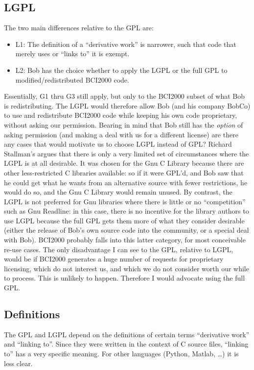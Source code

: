 \documentclass{article}
\begin{document}
\subsection*{LGPL}
The two main differences relative to the GPL are:
\begin{itemize}
    \item[] L1: The definition of a ``derivative work'' is narrower, such that code that merely uses or ``links to'' it is exempt.
    \item[] L2: Bob has the choice whether to apply the LGPL or the full GPL to modified/redistributed BCI2000 code.
\end{itemize}

Essentially, G1 thru G3 still apply, but only to the BCI2000 subset of what Bob is redistributing. The LGPL would therefore allow Bob (and his company BobCo) to use and redistribute BCI2000 code while keeping his own code proprietary, without asking our permission.  Bearing in mind that Bob still has the {\em option} of asking permission (and making a deal with us for a different license) are there any cases that would motivate us to choose LGPL instead of GPL?  Richard Stallman's argues \cite{stallman} that there is only a very limited set of circumstances where the LGPL is at all desirable. It was chosen for the Gnu C Library because there are other less-restricted C libraries available: so if it were GPL'd, and Bob saw that he could get what he wants from an alternative source with fewer restrictions, he would do so, and the Gnu C Library would remain unused. By contrast, the LGPL is not preferred for Gnu libraries where there is little or no ``competition'' such as Gnu Readline: in this case, there is no incentive for the library authors to use LGPL because the full GPL gets them more of what they consider desirable (either the release of Bob's own source code into the community, or a special deal with Bob).  BCI2000 probably falls into this latter category, for most conceivable re-use cases.  The only disadvantage I can see to the GPL, relative to LGPL, would be if BCI2000 generates a huge number of requests for proprietary licensing, which do not interest us, and which we do not consider worth our while to process. This is unlikely to happen.  Therefore I would advocate using the full GPL.

\subsection*{Definitions}

The GPL and LGPL depend on the definitions of certain terms ``derivative work'' and ``linking to''.  Since they were written in the context of C source files, ``linking to'' has a very specific meaning.  For other languages (Python, Matlab, \ldots) it is less clear.
\end{document}
